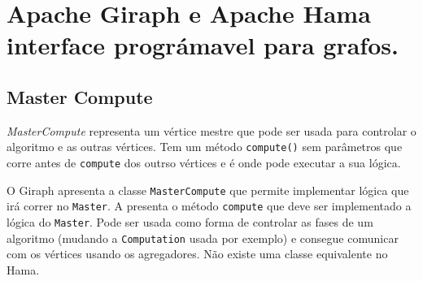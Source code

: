 \chapter{Apache Giraph e Apache Hama interface prográmavel para grafos.}

\section{Master Compute}
\textit{MasterCompute} representa um vértice mestre que pode ser usada para controlar o algoritmo e as outras vértices. Tem um método \texttt{compute()} sem parâmetros que corre antes de \texttt{compute} dos outrso vértices e é onde pode executar a sua lógica.


O Giraph apresenta a classe \texttt{MasterCompute} que permite implementar lógica que irá correr no \texttt{Master}. A presenta o método \texttt{compute} que deve ser implementado a lógica do \texttt{Master}. Pode ser usada como forma de controlar as fases de um algoritmo (mudando a \texttt{Computation} usada por exemplo) e consegue comunicar com os vértices usando os agregadores. Não existe uma classe equivalente no Hama.












